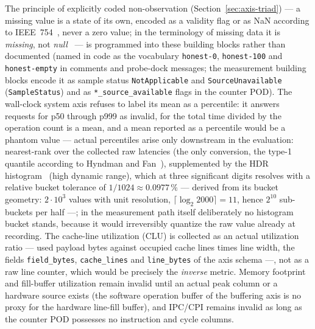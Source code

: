 \begin{nurlang}
The principle of explicitly coded non-observation (Section~\ref{sec:axis-triad}) --- a missing value
is a state of its own, encoded as a validity flag or as NaN according to IEEE~754~\cite{ieee754_2019},
never a zero value; in the terminology of missing data it is \emph{missing}, not
\emph{null}~\cite{rubin1976missing} --- is programmed into these building blocks rather than
documented (named in code as the vocabulary \texttt{honest-0}, \texttt{honest-100} and
\texttt{honest-empty} in comments and probe-dock messages; the measurement building blocks encode it
as sample status \texttt{NotApplicable} and \texttt{SourceUnavailable} (\texttt{SampleStatus}) and as
\texttt{*\_source\_available} flags in the counter POD). The wall-clock system axis refuses to label
its mean as a
percentile: it answers requests for p50 through p999 as invalid, for the total time divided by the
operation count is a mean, and a mean reported as a percentile would be a phantom value --- actual
percentiles arise only downstream in the evaluation: nearest-rank over the collected raw latencies (the
only conversion, the type-1 quantile according to Hyndman and Fan~\cite{hyndman1996quantiles}),
supplemented by the HDR histogram~\cite{tene_hdrhistogram} (high dynamic range), which at three
significant digits resolves with a relative bucket tolerance of $1/1024 \approx 0.0977\,\%$ ---
derived from its bucket geometry: $2\cdot10^{3}$ values with unit resolution,
$\lceil\log_2 2000\rceil = 11$, hence $2^{10}$ sub-buckets per half ---; in the measurement path itself
deliberately no histogram bucket stands, because it would irreversibly quantize the raw value already
at recording. The cache-line utilization (CLU) is collected as an actual utilization ratio --- used
payload bytes against occupied cache lines times line width, the fields \texttt{field\_bytes},
\texttt{cache\_lines} and \texttt{line\_bytes} of the axis schema ---, not as a raw line counter,
which would be precisely the \emph{inverse} metric. Memory footprint and fill-buffer utilization remain
invalid until an actual peak column or a hardware source exists (the software operation buffer of the
buffering axis is no proxy for the hardware line-fill buffer), and IPC/CPI remains invalid as long as
the counter POD possesses no instruction and cycle columns.
\end{nurlang}

